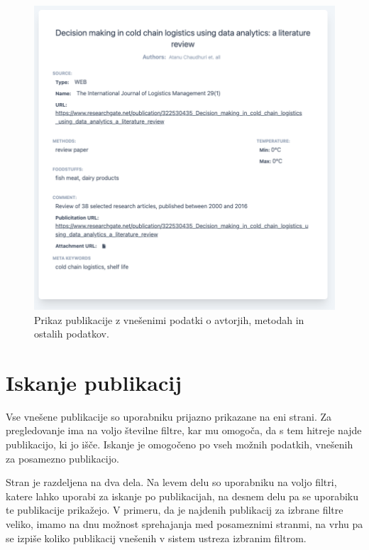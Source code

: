 \documentclass[a4paper, 12pt]{book}
\begin{document}
\begin{figure}[h]
\begin{center}
\includegraphics[width=1\textwidth]{slike/publicitation-info.png}
\end{center}
\caption{ Prikaz publikacije z vnešenimi podatki o avtorjih, metodah in ostalih podatkov. }
\label{publicitation-info}
\end{figure}

\clearpage

\section{Iskanje publikacij}
\label{filters-page}
Vse vnešene publikacije so uporabniku prijazno prikazane na eni strani. Za pregledovanje ima na voljo številne filtre, kar mu omogoča, da s tem hitreje najde publikacijo, ki jo išče. Iskanje je omogočeno po vseh možnih podatkih, vnešenih za posamezno publikacijo. 


Stran je razdeljena na dva dela. Na levem delu so uporabniku na voljo filtri, katere lahko uporabi za iskanje po publikacijah, na desnem delu pa se uporabiku te publikacije prikažejo. V primeru, da je najdenih publikacij za izbrane filtre veliko, imamo na dnu možnost sprehajanja med posameznimi stranmi, na vrhu pa se izpiše koliko publikacij vnešenih v sistem ustreza izbranim filtrom.
\end{document}
